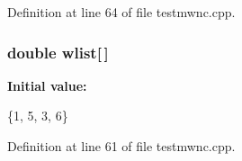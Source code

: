 Definition at line 64 of file testmwnc.\-cpp.

\subsubsection[{wlist}]{\setlength{\rightskip}{0pt plus 5cm}double wlist[$\,$]}\label{toolboxes_2rnd_2testmwnc_8cpp_a0f9888e52a4c32fd392577b5e258d45b}
{\bfseries Initial value\-:}
\begin{DoxyCode}
 
  \{1, 5, 3, 6\}
\end{DoxyCode}


Definition at line 61 of file testmwnc.\-cpp.

